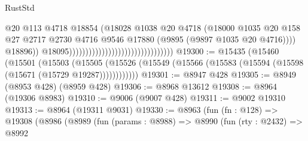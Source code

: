 \begin{lexlean}{RustStd}
\begin{coremodule}
                                                                        @20
                                                                        @113
                                                                        @4718
                                                                        @18854
                                                                        (@18028
                                                                          @1038
                                                                          @20
                                                                          @4718
                                                                          (@18000
                                                                            @1035
                                                                            @20
                                                                            @158
                                                                            @27
                                                                            @2717
                                                                            @2730
                                                                            @4716
                                                                            @9546
                                                                            @17880
                                                                            (@9895
                                                                              (@9897
                                                                                @1035
                                                                                @20
                                                                                @4716))))
                                                                        @18896))
                                                                    @18095))))))))))))))))))))))))))))))))
@19300 := @15435
    (@15460
      (@15501
        (@15503
          (@15505 (@15526 (@15549 (@15566 (@15583 (@15594 (@15598 (@15671 (@15729 @19287))))))))))))
@19301 := @8947 @428
@19305 := @8949 (@8953 @428) (@8959 @428)
@19306 := @8968 @13612
@19308 := @8964 (@19306 @8983)
@19310 := @9006 (@9007 @428)
@19311 := @9002 @19310
@19313 := @8964 (@19311 @9031)
@19330 := @8963
    (fun (fn : @128) =>
    @19308
      (@8986
        (@8989
          (fun (params : @8988) =>
          @8990
            (fun (rty : @2432) =>
            @8992

\end{coremodule}
\end{lexlean}
